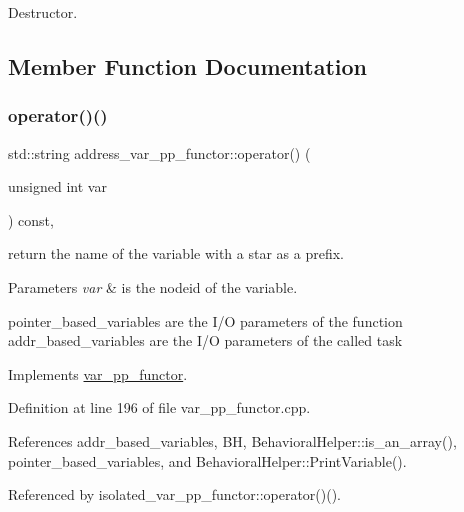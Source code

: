 Destructor. 



\subsection{Member Function Documentation}
\mbox{\label{structaddress__var__pp__functor_a53bd3e80f4e77c018125c61d54001744}} 
\subsubsection{\texorpdfstring{operator()()}{operator()()}}
{\footnotesize\ttfamily std\+::string address\+\_\+var\+\_\+pp\+\_\+functor\+::operator() (\begin{DoxyParamCaption}\item[{unsigned int}]{var }\end{DoxyParamCaption}) const\hspace{0.3cm}{\ttfamily [override]}, {\ttfamily [virtual]}}



return the name of the variable with a star as a prefix. 


\begin{DoxyParams}{Parameters}
{\em var} & is the nodeid of the variable. \\
\hline
\end{DoxyParams}
pointer\+\_\+based\+\_\+variables are the I/O parameters of the function addr\+\_\+based\+\_\+variables are the I/O parameters of the called task 

Implements \hyperlink{structvar__pp__functor_a6bcbd4e1551ac2584638ef70ecc6f361}{var\+\_\+pp\+\_\+functor}.



Definition at line 196 of file var\+\_\+pp\+\_\+functor.\+cpp.



References addr\+\_\+based\+\_\+variables, BH, Behavioral\+Helper\+::is\+\_\+an\+\_\+array(), pointer\+\_\+based\+\_\+variables, and Behavioral\+Helper\+::\+Print\+Variable().



Referenced by isolated\+\_\+var\+\_\+pp\+\_\+functor\+::operator()().

